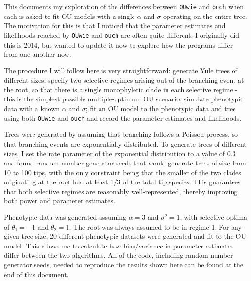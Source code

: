 \documentclass[12pt,reqno,final]{amsart}\usepackage[]{graphicx}\usepackage[]{color}
\title[]{}
\theoremstyle{plain}
\numberwithin{equation}{part}
\begin{document}
\maketitle

This documents my exploration of the differences between \texttt{OUwie} and \texttt{ouch} when each is asked to fit OU models with a single $\alpha$ and $\sigma$ operating on the entire tree.
The motivation for this is that I noticed that the parameter estimates and likelihoods reached by \texttt{OUwie} and \texttt{ouch} are often quite different.
I originally did this is 2014, but wanted to update it now to explore how the programs differ from one another now.

The procedure I will follow here is very straightforward: generate Yule trees of different sizes; specify two selective regimes arising out of the branching event at the root, so that there is a single monophyletic clade in each selective regime - this is the simplest possible multiple-optimum OU scenario; simulate phenotypic data with a known $\alpha$ and $\sigma$; fit an OU model to the phenotypic data and tree using both \texttt{OUwie} and \texttt{ouch} and record the
parameter estimates and likelihoods.

Trees were generated by assuming that branching follows a Poisson process, so that branching events are exponentially distributed. To generate trees of different sizes, I set the rate parameter of the exponential distribution to a value of 0.3 and found random number generator seeds that would generate trees of size from 10 to 100 tips, with the only constraint being that the smaller of the two clades originating at the root had at least 1/3 of the total tip species.
This guarantees that both selective regimes are reasonably well-represented, thereby improving both power and parameter estimates.

Phenotypic data was generated assuming $\alpha=3$ and $\sigma^2=1$, with selective optima of $\theta_1=-1$ and $\theta_2=1$. The root was always assumed to be in regime 1. For any given tree size, 20 different phenotypic datasets were generated and fit to the OU model.
This allows me to calculate how bias/variance in parameter estimates differ between the two algorithms.
All of the code, including random number generator seeds, needed to reproduce the results shown here can be found at the end of this document.
\end{document}
